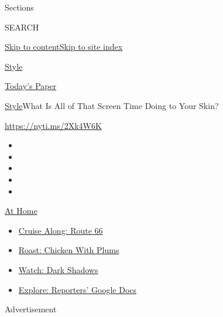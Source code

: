 Sections

SEARCH

\protect\hyperlink{site-content}{Skip to
content}\protect\hyperlink{site-index}{Skip to site index}

\href{https://www.nytimes3xbfgragh.onion/section/style}{Style}

\href{https://myaccount.nytimes3xbfgragh.onion/auth/login?response_type=cookie\&client_id=vi}{}

\href{https://www.nytimes3xbfgragh.onion/section/todayspaper}{Today's
Paper}

\href{/section/style}{Style}\textbar{}What Is All of That Screen Time
Doing to Your Skin?

\url{https://nyti.ms/2Xk4W6K}

\begin{itemize}
\item
\item
\item
\item
\item
\end{itemize}

\href{https://www.nytimes3xbfgragh.onion/spotlight/at-home?action=click\&pgtype=Article\&state=default\&region=TOP_BANNER\&context=at_home_menu}{At
Home}

\begin{itemize}
\tightlist
\item
  \href{https://www.nytimes3xbfgragh.onion/2020/09/07/travel/route-66.html?action=click\&pgtype=Article\&state=default\&region=TOP_BANNER\&context=at_home_menu}{Cruise
  Along: Route 66}
\item
  \href{https://www.nytimes3xbfgragh.onion/2020/09/04/dining/sheet-pan-chicken.html?action=click\&pgtype=Article\&state=default\&region=TOP_BANNER\&context=at_home_menu}{Roast:
  Chicken With Plums}
\item
  \href{https://www.nytimes3xbfgragh.onion/2020/09/04/arts/television/dark-shadows-stream.html?action=click\&pgtype=Article\&state=default\&region=TOP_BANNER\&context=at_home_menu}{Watch:
  Dark Shadows}
\item
  \href{https://www.nytimes3xbfgragh.onion/interactive/2020/at-home/even-more-reporters-editors-diaries-lists-recommendations.html?action=click\&pgtype=Article\&state=default\&region=TOP_BANNER\&context=at_home_menu}{Explore:
  Reporters' Google Docs}
\end{itemize}

Advertisement

